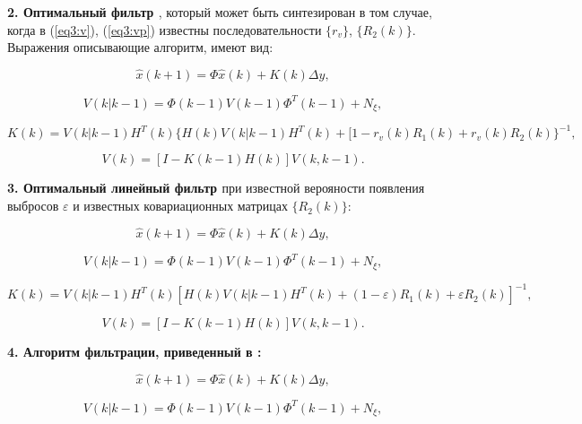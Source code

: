 \textbf{2. Оптимальный фильтр \cite{Klekis}}, который может быть синтезирован в том случае, когда в (\ref{eq3:v}), (\ref{eq3:vp}) известны последовательности $\{r_v\}$, $\{R_2(k)\}$. Выражения описывающие алгоритм, имеют вид:

\begin{equation}\label{eq3:optim2}
\hat{x}(k+1)=\Phi\hat{x}(k)+K(k)\Delta y,
\end{equation}

\begin{equation}\label{eq3:optim2_3}
V(k|k-1)=\Phi(k-1)V(k-1)\Phi^T(k-1)+N_\xi,
\end{equation}

\begin{equation}\label{eq3:optim2_4}
K(k)=V(k|k-1)H^T(k)\{H(k)V(k|k-1)H^T(k)+[1-r_v(k)R_1(k)+r_v(k)R_2(k)\}^{-1},
\end{equation}

\begin{equation}\label{eq3:optim2_5}
V(k)=[I-K(k-1)H(k)]V(k,k-1).
\end{equation}

\textbf{3. Оптимальный линейный фильтр \cite{Klekis}} при известной верояности появления выбросов $\varepsilon$ и известных ковариационных матрицах $\{R_2(k)\}$:

\begin{equation}\label{eq3:optim3}
\hat{x}(k+1)=\Phi\hat{x}(k)+K(k)\Delta y,
\end{equation}

\begin{equation}\label{eq3:optim3_3}
V(k|k-1)=\Phi(k-1)V(k-1)\Phi^T(k-1)+N_\xi,
\end{equation}

\begin{equation}\label{eq3:optim3_4}
K(k)=V(k|k-1)H^T(k)[H(k)V(k|k-1)H^T(k)+(1-\varepsilon)R_1(k)+\varepsilon R_2(k)]^{-1},
\end{equation}

\begin{equation}\label{eq3:optim3_5}
V(k)=[I-K(k-1)H(k)]V(k,k-1).
\end{equation}

\textbf{4. Алгоритм фильтрации, приведенный в \cite{ershov}:}

\begin{equation}\label{eq3:optim4}
\hat{x}(k+1)=\Phi\hat{x}(k)+K(k)\Delta y,
\end{equation}

\begin{equation}\label{eq3:optim4_3}
V(k|k-1)=\Phi(k-1)V(k-1)\Phi^T(k-1)+N_\xi,
\end{equation}

